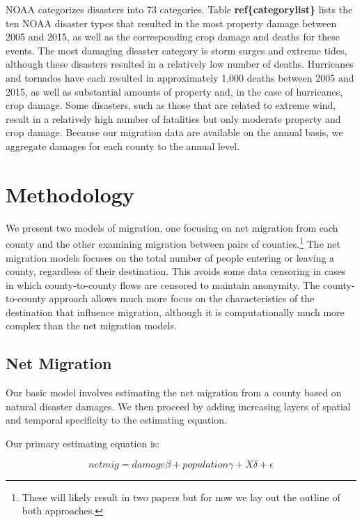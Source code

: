 \documentclass[]{article}
\let\rmarkdownfootnote\footnote%
\def\footnote{\protect\rmarkdownfootnote}
\begin{document}
NOAA categorizes disasters into 73 categories. Table
\textbf{ref\{categorylist\}} lists the ten NOAA disaster types that
resulted in the most property damage between 2005 and 2015, as well as
the corresponding crop damage and deaths for these events. The most
damaging disaster category is storm surges and extreme tides, although
these disasters resulted in a relatively low number of deaths.
Hurricanes and tornados have each resulted in approximately 1,000 deaths
between 2005 and 2015, as well as substantial amounts of property and,
in the case of hurricanes, crop damage. Some disasters, such as those
that are related to extreme wind, result in a relatively high number of
fatalities but only moderate property and crop damage. Because our
migration data are available on the annual basis, we aggregate damages
for each county to the annual level.

\section{Methodology}\label{methodology}

We present two models of migration, one focusing on net migration from
each county and the other examining migration between pairs of
counties.\footnote{These will likely result in two papers but for now we
  lay out the outline of both approaches.} The net migration models
focuses on the total number of people entering or leaving a county,
regardless of their destination. This avoids some data censoring in
cases in which county-to-county flows are censored to maintain
anonymity. The county-to-county approach allows much more focus on the
characteristics of the destination that influence migration, although it
is computationally much more complex than the net migration models.

\subsection{Net Migration}\label{net-migration}

Our basic model involves estimating the net migration from a county
based on natural disaster damages. We then proceed by adding increasing
layers of spatial and temporal specificity to the estimating equation.

Our primary estimating equation is:

\begin{equation} \label{olsequation}
netmig =  damage\beta + population \gamma + X \delta +\epsilon 
\end{equation}
\end{document}
